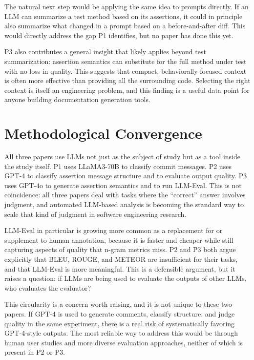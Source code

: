 \documentclass[
    pdftex,
    final,
    11pt,
    a4paper,
    parskip=false,
    oneside,
    footheight=0mm,
    footinclude=false,
    toc=bibliography
]{scrbook}
\begin{document}
The natural next step would be applying the same idea to prompts directly. If an LLM can summarize a test method based on its assertions, it could in principle also summarize what changed in a prompt based on a before-and-after diff. This would directly address the gap P1 identifies, but no paper has done this yet.

P3 also contributes a general insight that likely applies beyond test summarization: assertion semantics can substitute for the full method under test with no loss in quality. This suggests that compact, behaviorally focused context is often more effective than providing all the surrounding code. Selecting the right context is itself an engineering problem, and this finding is a useful data point for anyone building documentation generation tools.

\section{Methodological Convergence}

All three papers use LLMs not just as the subject of study but as a tool inside the study itself. P1 uses LLaMA3-70B to classify commit messages. P2 uses GPT-4 to classify assertion message structure and to evaluate output quality. P3 uses GPT-4o to generate assertion semantics and to run LLM-Eval. This is not coincidence: all three papers deal with tasks where the ``correct'' answer involves judgment, and automated LLM-based analysis is becoming the standard way to scale that kind of judgment in software engineering research.

LLM-Eval in particular is growing more common as a replacement for or supplement to human annotation, because it is faster and cheaper while still capturing aspects of quality that n-gram metrics miss. P2 and P3 both argue explicitly that BLEU, ROUGE, and METEOR are insufficient for their tasks, and that LLM-Eval is more meaningful. This is a defensible argument, but it raises a question: if LLMs are being used to evaluate the outputs of other LLMs, who evaluates the evaluator?

This circularity is a concern worth raising, and it is not unique to these two papers. If GPT-4 is used to generate comments, classify structure, and judge quality in the same experiment, there is a real risk of systematically favoring GPT-4-style outputs. The most reliable way to address this would be through human user studies and more diverse evaluation approaches, neither of which is present in P2 or P3.
\end{document}
